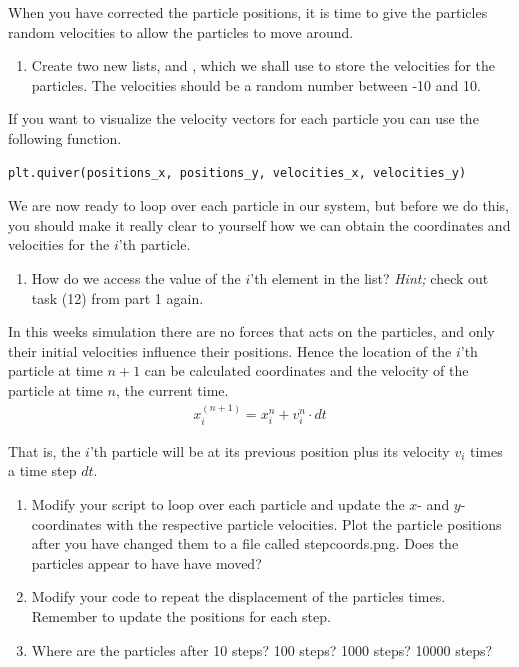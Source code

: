 \documentclass{article}
\begin{document}
\newpage

When you have corrected the particle positions, it is time to give the particles random velocities to allow the particles to move around.

\begin{enumerate}[resume]
    \item Create two new lists,  and , which we shall use to store the velocities for the particles.
    The velocities should be a random number between -10 and 10.
\end{enumerate}

If you want to visualize the velocity vectors for each particle you can use the following function.\\

\begin{lstlisting}
plt.quiver(positions_x, positions_y, velocities_x, velocities_y)
\end{lstlisting}

We are now ready to loop over each particle in our system, but before we do this, you should make it really clear to yourself how we can obtain the coordinates and velocities for the $i$'th particle.

\begin{enumerate}[resume]
  \item How do we access the value of the $i$'th element in the  list?
      {\em Hint;} check out task (12) from part 1 again.

\end{enumerate}

In this weeks simulation there are no forces that acts on the particles, and only their initial velocities influence their positions.
Hence the location of the $i$'th particle at time $n+1$ can be calculated coordinates and the velocity of the
particle at time $n$, the current time.
\begin{align}
  x_i^{(n+1)} = x^n_i + v_{i}^n \cdot dt
\end{align}

That is, the $i$'th particle will be at its previous position plus its velocity $v_i$ times a time step $dt$.

\begin{enumerate}[resume]
  \item
    Modify your script to loop over each particle and update the $x$- and $y$-coordinates with the respective particle velocities.
    Plot the particle positions after you have changed them to a file called stepcoords.png.
    Does the particles appear to have have moved?

  \item Modify your code to repeat the displacement of the particles  times.
      Remember to update the positions for each step.

  \item Where are the particles after 10 steps? 100 steps? 1000 steps? 10000 steps?

\end{enumerate}
\end{document}
